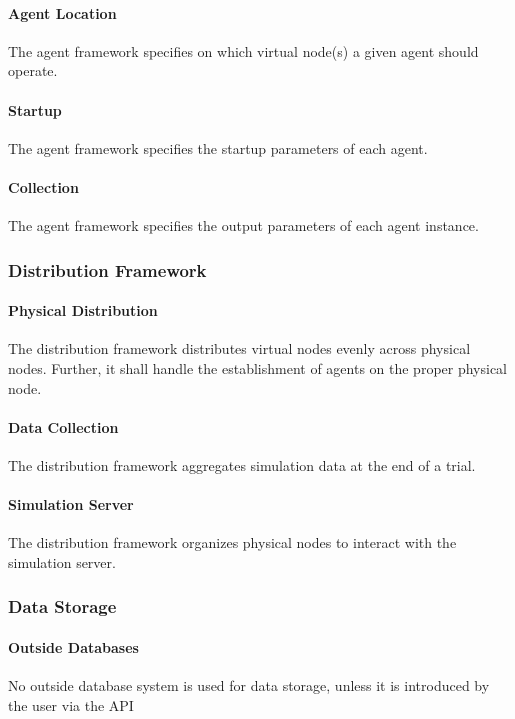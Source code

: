 \documentclass[titlepage]{article}
\begin{document}
\paragraph{Agent Location} The agent framework specifies on which virtual node(s) a given agent should operate.
\paragraph{Startup} The agent framework specifies the startup parameters of each agent.
\paragraph{Collection} The agent framework specifies the output parameters of each agent instance.

\subsubsection{Distribution Framework}
\paragraph{Physical Distribution} The distribution framework distributes virtual nodes evenly across physical
nodes.  Further, it shall handle the establishment of agents on the proper physical node.

\paragraph{Data Collection} The distribution framework aggregates simulation data at the end of a trial.

\paragraph{Simulation Server} The distribution framework organizes physical nodes to interact with the simulation
server.


\subsubsection{Data Storage%
  \label{data-storage}%
}
    \paragraph{Outside Databases} No outside database system is used for data storage, unless it is introduced by the user via the API
\end{document}
